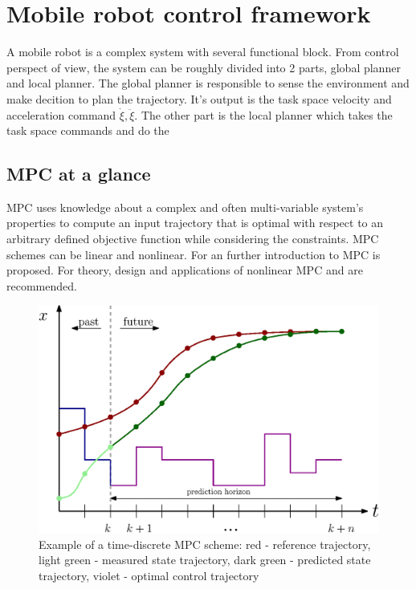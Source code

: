 \chapter{Mobile robot control framework}
\label{cha:framework}
A mobile robot is a complex system with several functional block. From control perspect of view, the system can be roughly divided into 2 parts, global planner and local planner.
The global planner is responsible to sense the environment and make decition to plan the trajectory. It's output is the task space velocity and acceleration command $\dot{\xi},\ddot{\xi}$. 
The other part is the local planner which takes the task space commands and do the 


\section{MPC at a glance}
\label{sec:mpc_glance}

MPC uses knowledge about a complex and often multi-variable system's properties to compute an input trajectory that is optimal with respect to an arbitrary defined objective function while considering the constraints.
MPC schemes can be linear and nonlinear.
For an further introduction to MPC \cite{Rawlings.2009} is proposed. For theory, design and applications of nonlinear MPC  \cite{Grune.2011} and \cite{Grancharova.2012b} are recommended.

\begin{figure}[t]
\begin{center}
\includegraphics[width=\textwidth]{../Figures/MPC_trajectory.eps}
\caption{Example of a time-discrete MPC scheme: red - reference trajectory, light green - measured state trajectory, dark green - predicted state trajectory, violet - optimal control trajectory}
\label{fig:controller}
\end{center}
\end{figure}

